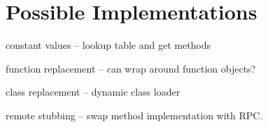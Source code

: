 \section{Possible Implementations}


constant values -- lookup table and get methods

function replacement -- can wrap around function objects?

class replacement -- dynamic class loader

remote stubbing -- swap method implementation with RPC.
